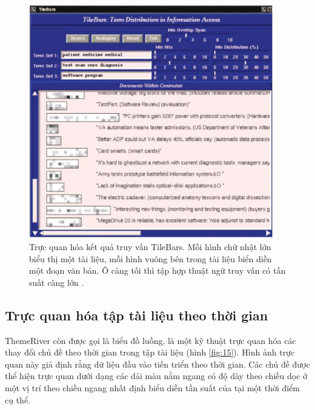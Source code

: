 \documentclass[14pt, a4paper]{article}
\numberwithin{equation}{section}
\numberwithin{figure}{section}
\numberwithin{dl}{section}
\numberwithin{md}{section}
\numberwithin{bd}{section}
\numberwithin{dn}{section}
\numberwithin{hq}{section}
\begin{document}
    \begin{figure}[h!]
        \centering
        \includegraphics[width=0.95\textwidth]{14.png}
        \caption{Trực quan hóa kết quả truy vấn TileBars.
        Mỗi hình chữ nhật lớn biểu thị một tài liệu, mỗi hình vuông bên trong tài liệu biển diễn một đoạn văn bản.
        Ô càng tối thì tập hợp thuật ngữ truy vấn có tần suất càng lớn \cite{178}.}
        \label{fig:14}
    \end{figure}

    \subsection{Trực quan hóa tập tài liệu theo thời gian}

    ThemeRiver \cite{173} còn được gọi là biểu đồ luồng, là một kỹ thuật trực quan hóa các thay đổi chủ đề theo thời gian trong tập tài liệu (hình \ref{fig:15}).
    Hình ảnh trực quan này giả định rằng dữ liệu đầu vào tiến triển theo thời gian.
    Các chủ đề được thể hiện trực quan dưới dạng các dải màu nằm ngang có độ dày theo chiều dọc ở một vị trí theo chiều ngang nhất định biểu diễn tần suất của tại một thời điểm cụ thể.
\end{document}
